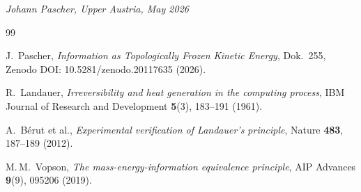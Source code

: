 \bigskip
\begin{flushright}
\textit{Johann Pascher, Upper Austria, May 2026}
\end{flushright}

\begin{thebibliography}{99}

J.~Pascher,
\textit{Information as Topologically Frozen Kinetic Energy},
Dok.~255, Zenodo DOI: 10.5281/zenodo.20117635 (2026).

R.~Landauer,
\textit{Irreversibility and heat generation in the computing process},
IBM Journal of Research and Development \textbf{5}(3), 183--191 (1961).

A.~Bérut et al.,
\textit{Experimental verification of Landauer's principle},
Nature \textbf{483}, 187--189 (2012).

M.\,M.~Vopson,
\textit{The mass-energy-information equivalence principle},
AIP Advances \textbf{9}(9), 095206 (2019).

\end{thebibliography}
